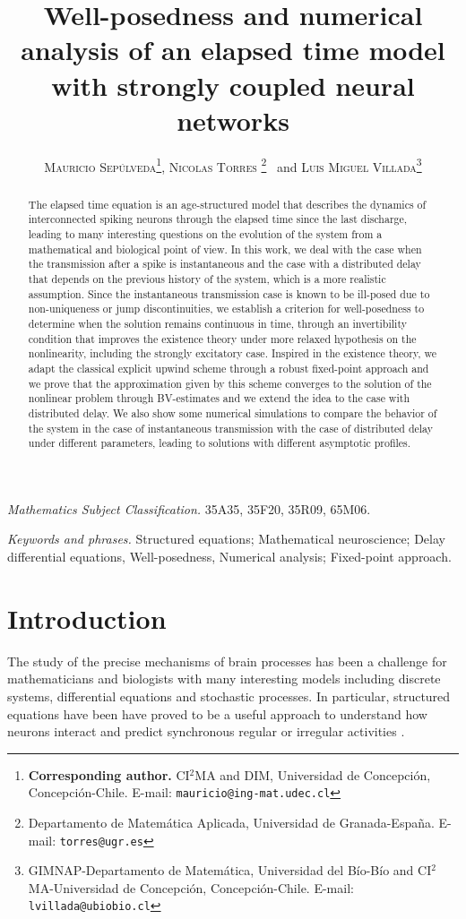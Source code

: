 \documentclass[11pt,a4paper]{article}
\title{Well-posedness and numerical analysis of an elapsed time model with strongly coupled neural networks}
\author{
\textsc{Mauricio Sep\'ulveda\thanks{\textbf{Corresponding author.} CI$^2$MA and DIM, Universidad de Concepci\'on, Concepci\'on-Chile. E-mail: \texttt{mauricio@ing-mat.udec.cl}}},
\textsc{Nicolas Torres \thanks{Departamento de Matemática Aplicada, Universidad de Granada-Espa\~na. E-mail: \texttt{torres@ugr.es}}} \, and      
\textsc{Luis Miguel Villada\thanks{GIMNAP-Departamento de Matem\'atica, Universidad del B\'io-B\'io and CI$^2$MA-Universidad de Concepci\'on, Concepci\'on-Chile. E-mail: \texttt{lvillada@ubiobio.cl}} }
}
\begin{document}
\maketitle
\begin{abstract}
The elapsed time equation is an age-structured model that describes the dynamics of interconnected spiking neurons through the elapsed time since the last discharge, leading to many interesting questions on the evolution of the system from a mathematical and biological point of view. In this work, we deal with the case when the transmission after a spike is instantaneous and the case with a distributed delay that depends on the previous history of the system, which is a more realistic assumption. Since the instantaneous transmission case is known to be ill-posed due to non-uniqueness or jump discontinuities, we establish a criterion for well-posedness to determine when the solution remains continuous in time, through an invertibility condition that improves the existence theory under more relaxed hypothesis on the nonlinearity, including the strongly excitatory case. Inspired in the existence theory, we adapt the classical explicit upwind scheme through a robust fixed-point approach and we prove that the approximation given by this scheme converges to the solution of the nonlinear problem through BV-estimates and we extend the idea to the case with distributed delay. We also show some numerical simulations to compare the behavior of the system in the case of instantaneous transmission with the case of distributed delay under different parameters, leading to solutions with different asymptotic profiles.
\end{abstract}


\noindent{\makebox[1in]\hrulefill} \textit{Mathematics Subject Classification.} 35A35, 35F20, 35R09, 65M06.


\textit{Keywords and phrases.} Structured equations; Mathematical neuroscience; Delay differential equations, Well-posedness, Numerical analysis; Fixed-point approach.

\section{Introduction}

The study of the precise mechanisms of brain processes has been a challenge for mathematicians and biologists with many interesting models including discrete systems, differential equations and stochastic processes. In particular, structured equations have been have proved to be a useful approach to understand how neurons interact and predict synchronous regular or irregular activities \cite{gerstner1995time,coombes2023neurodynamics,carrillo2025nonlinear}.
\end{document}
